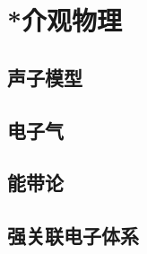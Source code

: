 

\section{*介观物理}\label{30-4}

\subsection{声子模型}\label{30-4-1}

\subsection{电子气}\label{30-4-2}

\subsection{能带论}\label{30-4-3}

\subsection{强关联电子体系}\label{30-4-4}